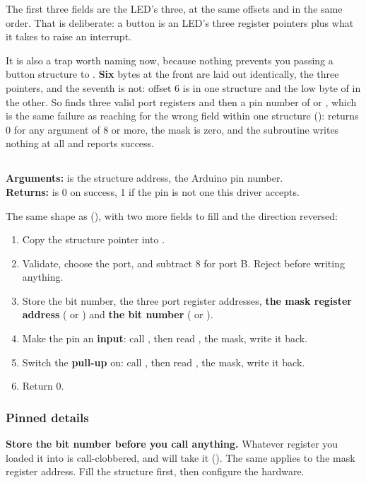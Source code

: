 The first three fields are the LED's three, at the same offsets and in the same order. That is
deliberate: a button is an LED's three register pointers plus what it takes to raise an interrupt.

It is also a trap worth naming now, because nothing prevents you passing a button structure to
. \textbf{Six} bytes at the front are laid out identically, the three pointers, and
the seventh is not: offset 6 is  in one structure and the low byte of
 in the other. So  finds three valid port registers and then a pin
number of  or , which is the same failure as reaching for the wrong field
within one structure ():  returns 0 for any argument of 8 or
more, the mask is zero, and the subroutine writes nothing at all and reports success.

\subsection{}
\label{c3:sec:init}
\noindent\textbf{Arguments:}  is the structure address,  the Arduino pin
number.\\
\textbf{Returns:}  is 0 on success, 1 if the pin is not one this driver accepts.

\medskip
\noindent The same shape as  (), with two more fields to fill
and the direction reversed:
\begin{enumerate}
  \item Copy the structure pointer into .
  \item Validate, choose the port, and subtract 8 for port B. Reject before writing anything.
  \item Store the bit number, the three port register addresses, \textbf{the mask register
    address} ( or ) and \textbf{the  bit number}
    ( or ).
  \item Make the pin an \textbf{input}: call , then read ,
     the mask, write it back.
  \item Switch the \textbf{pull-up} on: call , then read , 
    the mask, write it back.
  \item Return 0.
\end{enumerate}

\subsubsection{Pinned details}
\textbf{Store the  bit number before you call anything.} Whatever register you loaded
it into is call-clobbered, and  will take it (). The same
applies to the mask register address. Fill the structure first, then configure the hardware.

